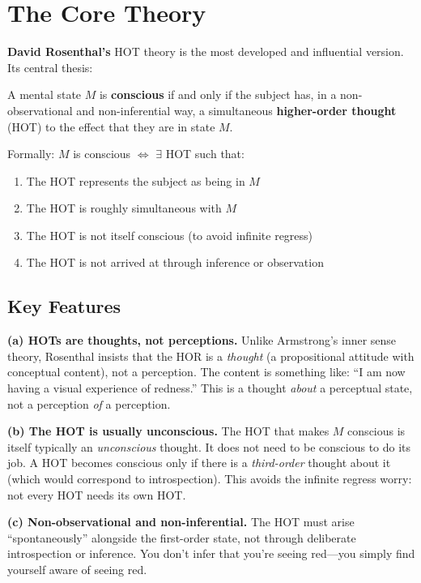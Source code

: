 \documentclass[11pt,a4paper]{report}
\begin{document}
\section{The Core Theory}

\textbf{David Rosenthal's} HOT theory is the most developed and influential version. Its central thesis:

\begin{principlebox}
A mental state $M$ is \textbf{conscious} if and only if the subject has, in a non-observational and non-inferential way, a simultaneous \textbf{higher-order thought} (HOT) to the effect that they are in state $M$.

Formally: $M$ is conscious $\iff$ $\exists$ HOT such that:
\begin{enumerate}[leftmargin=1.5em]
  \item The HOT represents the subject as being in $M$
  \item The HOT is roughly simultaneous with $M$
  \item The HOT is not itself conscious (to avoid infinite regress)
  \item The HOT is not arrived at through inference or observation
\end{enumerate}
\end{principlebox}

\subsection{Key Features}

\textbf{(a) HOTs are thoughts, not perceptions.} Unlike Armstrong's inner sense theory, Rosenthal insists that the HOR is a \emph{thought} (a propositional attitude with conceptual content), not a perception. The content is something like: ``I am now having a visual experience of redness.'' This is a thought \emph{about} a perceptual state, not a perception \emph{of} a perception.

\textbf{(b) The HOT is usually unconscious.} The HOT that makes $M$ conscious is itself typically an \emph{unconscious} thought. It does not need to be conscious to do its job. A HOT becomes conscious only if there is a \emph{third-order} thought about it (which would correspond to introspection). This avoids the infinite regress worry: not every HOT needs its own HOT.

\textbf{(c) Non-observational and non-inferential.} The HOT must arise ``spontaneously'' alongside the first-order state, not through deliberate introspection or inference. You don't infer that you're seeing red---you simply find yourself aware of seeing red.
\end{document}
